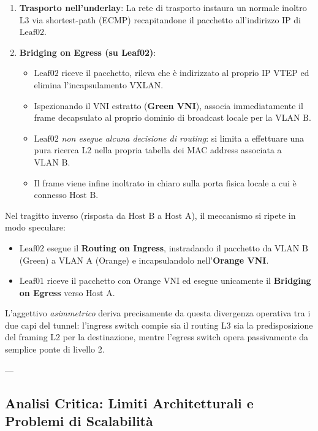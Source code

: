 \documentclass[11pt, a4paper]{article}
\begin{document}
\begin{enumerate}
    \item \textbf{Trasporto nell'underlay}: La rete di trasporto instaura un normale inoltro L3 via shortest-path (ECMP) recapitandone il pacchetto all'indirizzo IP di $\text{Leaf02}$.

    \item \textbf{Bridging on Egress (su Leaf02)}:
    \begin{itemize}[noitemsep]
        \item $\text{Leaf02}$ riceve il pacchetto, rileva che è indirizzato al proprio IP VTEP ed elimina l'incapsulamento VXLAN.
        \item Ispezionando il VNI estratto (\textbf{Green VNI}), associa immediatamente il frame decapsulato al proprio dominio di broadcast locale per la $\text{VLAN B}$.
        \item $\text{Leaf02}$ \emph{non esegue alcuna decisione di routing}: si limita a effettuare una pura ricerca L2 nella propria tabella dei MAC address associata a $\text{VLAN B}$.
        \item Il frame viene infine inoltrato in chiaro sulla porta fisica locale a cui è connesso $\text{Host B}$.
    \end{itemize}
\end{enumerate}

Nel tragitto inverso (risposta da $\text{Host B}$ a $\text{Host A}$), il meccanismo si ripete in modo speculare:
\begin{itemize}[noitemsep]
    \item $\text{Leaf02}$ esegue il \textbf{Routing on Ingress}, instradando il pacchetto da $\text{VLAN B}$ (Green) a $\text{VLAN A}$ (Orange) e incapsulandolo nell'\textbf{Orange VNI}.
    \item $\text{Leaf01}$ riceve il pacchetto con Orange VNI ed esegue unicamente il \textbf{Bridging on Egress} verso $\text{Host A}$.
\end{itemize}

L'aggettivo \emph{asimmetrico} deriva precisamente da questa divergenza operativa tra i due capi del tunnel: l'ingress switch compie sia il routing L3 sia la predisposizione del framing L2 per la destinazione, mentre l'egress switch opera passivamente da semplice ponte di livello 2.

---

\subsection{Analisi Critica: Limiti Architetturali e Problemi di Scalabilità}
\end{document}
